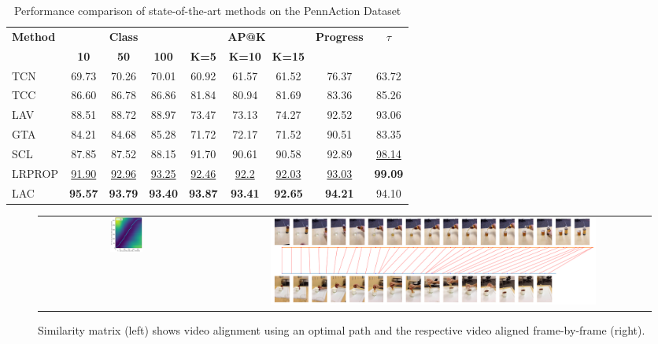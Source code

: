 \begin{table}[]
\small
\centering
\begin{tabularx}{\textwidth}{X|ccc|ccc|c|c}
\multirow{2}{*}{\textbf{Method}} & \multicolumn{3}{c|}{\textbf{Class}} & \multicolumn{3}{c|}{\textbf{AP@K}} & \multirow{2}{*}{\textbf{Progress}} & \multirow{2}{*}{\textbf{$\tau$}} \\ 
\cline{2-7}
 & \textbf{10} & \textbf{50} & \textbf{100} & \textbf{K=5} & \textbf{K=10} & \textbf{K=15} & & \\ 
\hline
\hline
TCN \cite{2017_tcn}        & 69.73 & 70.26 & 70.01 & 60.92 & 61.57 & 61.52 &  76.37 & 63.72 \\
TCC \cite{2019_tcc}        & 86.60 & 86.78 & 86.86 & 81.84 & 80.94 & 81.69 &  83.36 & 85.26 \\
LAV \cite{2021_lav}        & 88.51 & 88.72 & 88.97 & 73.47 & 73.13 & 74.27 &  92.52 & 93.06 \\
GTA \cite{2021_gta}        & 84.21 & 84.68 & 85.28 & 71.72 & 72.17 & 71.52 &  90.51 & 83.35 \\
SCL \cite{2022_carl}       & 87.85 & 87.52 & 88.15 & 91.70 & 90.61 & 90.58 &  92.89 & \underline{98.14}\\
LRPROP \cite{2024_lrprop}  & \underline{91.90} & \underline{92.96} & \underline{93.25} & \underline{92.46} & \underline{92.2} & \underline{92.03} & \underline{93.03} & \textbf{99.09} \\
\hline
LAC & \textbf{95.57} & \textbf{93.79} & \textbf{93.40} & \textbf{93.87} & \textbf{93.41} & \textbf{92.65} & \textbf{94.21} & 94.10 \\
\hline
\hline
\end{tabularx}
\caption{Performance comparison of state-of-the-art methods on the PennAction Dataset \cite{2013_pennaction}}
\label{tab: pn_class}
\end{table}

\begin{figure}[t]
\begin{tabular}{cc}
\includegraphics[width=0.195\textwidth]{images/v1.png}&\includegraphics[width=0.764\textwidth]{images/v2.png}
\end{tabular}
\caption{Similarity matrix (left) shows video alignment using an optimal path and the respective video aligned frame-by-frame (right).}
\label{fig: vis_align}
\end{figure}

